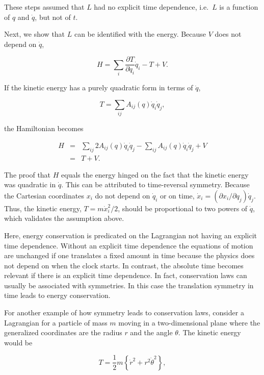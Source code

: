 \documentclass[%
oneside,                 %
final,                   %
10pt]{article}
\begin{document}
These steps assumed that $L$ had no explicit time dependence, i.e.~$L$
is a function of $q$ and $\dot{q}$, but not of $t$.

Next, we show that $L$ can be identified with the energy. Because $V$ does not depend on $\dot{q}$,

\begin{equation}
H=\sum_i\frac{\partial T}{\partial\dot{q}_i}\dot{q}_i-T+V.
\end{equation}

If the kinetic energy has a purely quadratic form in terms of $\dot{q}$,

\begin{equation}
T=\sum_{ij}A_{ij}(q)\dot{q}_i\dot{q}_j,
\end{equation}

the Hamiltonian becomes

\begin{eqnarray}
H&=&\sum_{ij}2A_{ij}(q)\dot{q}_i\dot{q}_j-\sum_{ij}A_{ij}(q)\dot{q}_i\dot{q}_j+V\\
\nonumber
&=&T+V.
\end{eqnarray}

The proof that $H$ equals the energy hinged on the fact that the
kinetic energy was quadratic in $\dot{q}$. This can be attributed to
time-reversal symmetry. Because the Cartesian coordinates $x_i$ do not
depend on $\dot{q}_i$ or on time, $\dot{x}_i=(\partial x_i/\partial
q_j)\dot{q}_j$. Thus, the kinetic energy, $T=m\dot{x}_i^2/2$, should
be proportional to two powers of $\dot{q}$, which validates the
assumption above.

Here, energy conservation is predicated on the Lagrangian not having
an explicit time dependence. Without an explicit time dependence the
equations of motion are unchanged if one translates a fixed amount in
time because the physics does not depend on when the clock starts. In
contrast, the absolute time becomes relevant if there is an explicit
time dependence. In fact, conservation laws can usually be associated
with symmetries. In this case the translation symmetry in time leads
to energy conservation.

For another example of how symmetry leads to conservation laws,
consider a Lagrangian for a particle of mass $m$ moving in a
two-dimensional plane where the generalized coordinates are the radius
$r$ and the angle $\theta$. The kinetic energy would be

\begin{equation}
T=\frac{1}{2}m\left\{\dot{r}^2+r^2\dot{\theta}^2\right\},
\end{equation}
\end{document}
